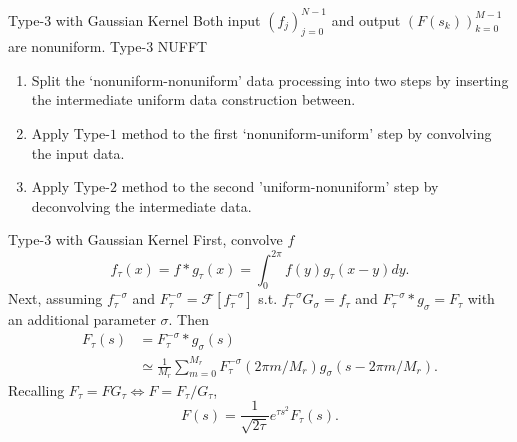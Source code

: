 \documentclass{beamer}
\begin{document}
\begin{frame}{Type-$3$ with Gaussian Kernel}
  Both input $(f_{j})_{j=0}^{N-1}$ and output $(F(s_{k}))_{k=0}^{M-1}$ are nonuniform.
  Type-$3$ NUFFT
  \begin{enumerate}
    \item Split the `nonuniform-nonuniform' data processing into two steps
    by inserting the intermediate uniform data construction between.
    \item Apply Type-$1$ method to the first `nonuniform-uniform' step by convolving the input data.
    \item Apply Type-$2$ method to the second 'uniform-nonuniform' step by deconvolving the intermediate data.
  \end{enumerate}
\end{frame}

\begin{frame}{Type-$3$ with Gaussian Kernel}
  First, convolve $f$
  \begin{equation}
      f_{\tau}(x) = f\ast g_{\tau} (x) = \int_{0}^{2\pi} f(y)g_{\tau}(x-y) dy.
  \end{equation}
  Next, assuming $f_{\tau}^{-\sigma}$ and $F_{\tau}^{-\sigma} = \mathcal{F}[f_{\tau}^{-\sigma}]$
  s.t.
  $f_{\tau}^{-\sigma}G_{\sigma} = f_{\tau}$ and $F_{\tau}^{-\sigma}\ast g_{\sigma} = F_{\tau}$
  with an additional parameter $\sigma$. Then
  \begin{align}
    F_{\tau}(s) &= F_{\tau}^{-\sigma}\ast g_{\sigma} (s) \\
    &\simeq \frac{1}{M_{r}}\sum_{m=0}^{M_{r}}
            F_{\tau}^{-\sigma}(2\pi m/M_{r})g_{\sigma}(s - 2\pi m/M_{r}).
  \end{align}
  Recalling $F_{\tau} = FG_{\tau} \Leftrightarrow F = F_{\tau}/G_{\tau}$,
  \begin{equation}
    F(s) = \frac{1}{\sqrt{2\tau}}e^{\tau s^2}F_{\tau}(s).
  \end{equation}
\end{frame}
\end{document}
